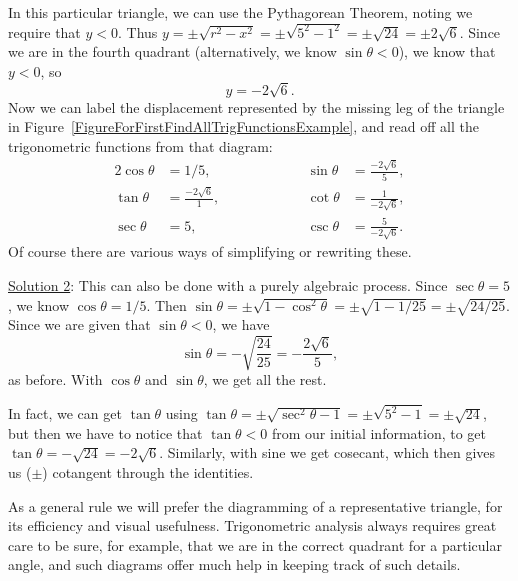 In this particular triangle, we can use the Pythagorean
Theorem, noting we require that $y<0$.\footnotemark
Thus $y=\pm\sqrt{r^2-x^2}=\pm\sqrt{5^2-1^2}=\pm\sqrt{24}=\pm2\sqrt6$.
Since we are in the fourth quadrant (alternatively,
we know $\sin\theta<0$), we know that $y<0$,
so 
$$y=-2\sqrt6.$$
Now we can label the displacement represented by the missing
leg of the triangle in 
Figure~\ref{FigureForFirstFindAllTrigFunctionsExample},
and read off all the trigonometric functions from 
that diagram:
\begin{alignat*}{2}
\cos\theta&=1/5,\qquad\qquad\qquad&\sin\theta&=\frac{-2\sqrt6}5,\\
\tan\theta&=\frac{-2\sqrt6}{1},&\cot\theta&=\frac1{-2\sqrt6},\\
\sec\theta&=5,&\csc\theta&=\frac{5}{-2\sqrt6}.\end{alignat*}
Of course there are various ways of simplifying or rewriting these.

\underline{Solution 2}: This can also be done with a 
purely algebraic process.  Since $\sec\theta=5$, we know
$\cos\theta=1/5$.  Then
$\sin\theta=\pm\sqrt{1-\cos^2\theta}=\pm\sqrt{1-1/25}=\pm\sqrt{24/25}$.
Since we are given that $\sin\theta<0$, we have
$$\sin\theta=-\sqrt{\frac{24}{25}}=-\frac{2\sqrt6}5,$$
as before.  With $\cos\theta$ and $\sin\theta$, we get all the rest.

In fact, we can get $\tan\theta$ using 
$\tan\theta=\pm\sqrt{\sec^2\theta-1}=\pm\sqrt{5^2-1}=\pm\sqrt{24}$,
but then we have to notice that $\tan\theta<0$ from our 
initial information, to get $\tan\theta=-\sqrt{24}=-2\sqrt6$.
Similarly, with sine we get cosecant, which then gives us
($\pm$) cotangent through the identities.
\label{FirstFindAllTrigFunctionsExample}
\eex

As a general rule we will prefer the diagramming of a representative
triangle, for its efficiency and visual usefulness.
Trigonometric analysis always requires great care to be sure,
for example, that
we are in the correct quadrant for a particular angle,
and such diagrams offer much help in keeping track of such
details.

